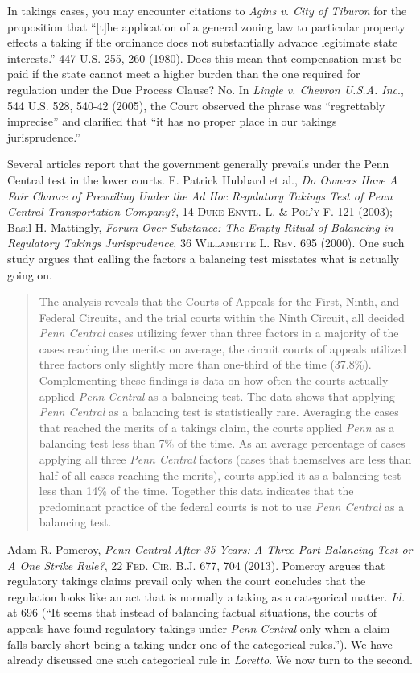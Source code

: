 In takings cases, you may encounter citations to \textit{Agins v. City of
Tiburon} for the proposition that ``[t]he application of a general zoning law to
particular property effects a taking if the ordinance does not substantially
advance legitimate state interests.'' 447 U.S. 255, 260 (1980). Does this mean
that compensation must be paid if the state cannot meet a higher burden than the
one required for regulation under the Due Process Clause? No. In \textit{Lingle
v. Chevron U.S.A. Inc}., 544 U.S. 528, 540-42 (2005), the Court observed the
phrase was ``regrettably imprecise'' and clarified that ``it has no proper place
in our takings jurisprudence.''



\item Several articles report that the government generally prevails under the
Penn Central test in the lower courts. F. Patrick Hubbard et al., \emph{Do
Owners Have
A Fair Chance of Prevailing Under the Ad Hoc Regulatory Takings Test of Penn
Central Transportation Company?}, 14 \textsc{Duke Envtl. L. \& Pol'y F}. 121
(2003); Basil H. Mattingly, \emph{Forum Over Substance: The Empty Ritual of
Balancing
in Regulatory Takings Jurisprudence}, 36 \textsc{Willamette L. Rev}. 695 (2000).
One such study argues that calling the factors a balancing test misstates what
is actually going on.
\begin{quote}
The analysis reveals that the Courts of Appeals for the First, Ninth, and
Federal Circuits, and the trial courts within the Ninth Circuit, all decided
\textit{Penn Central} cases utilizing fewer than three factors in a majority of
the cases reaching the merits: on average, the circuit courts of appeals
utilized three factors only slightly more than one-third of the time (37.8\%).
Complementing these findings is data on how often the courts actually applied
\textit{Penn Central} as a balancing test. The data shows that applying
\textit{Penn Central} as a balancing test is statistically rare. Averaging the
cases that reached the merits of a takings claim, the courts applied
\textit{Penn} as a balancing test less than 7\% of the time. As an average
percentage of cases applying all three \textit{Penn Central} factors (cases that
themselves are less than half of all cases reaching the merits), courts applied
it as a balancing test less than 14\% of the time. Together this data indicates
that the predominant practice of the federal courts is not to use \textit{Penn
Central} as a balancing test.
\end{quote}
Adam R. Pomeroy, \textit{Penn Central After 35 Years: A Three Part Balancing
Test or A One Strike Rule?}, 22 \textsc{Fed. Cir. B.J.} 677, 704 (2013).
Pomeroy argues that regulatory takings claims prevail only when the court
concludes that the regulation looks like an act that is normally a taking as a
categorical matter. \textit{Id.} at 696 (``It seems that instead of balancing
factual situations, the courts of appeals have found regulatory takings under
\textit{Penn Central} only when a claim falls barely short being a taking under
one of the categorical rules.''). We have already discussed one such categorical
rule in \textit{Loretto}. We now turn to the second.




